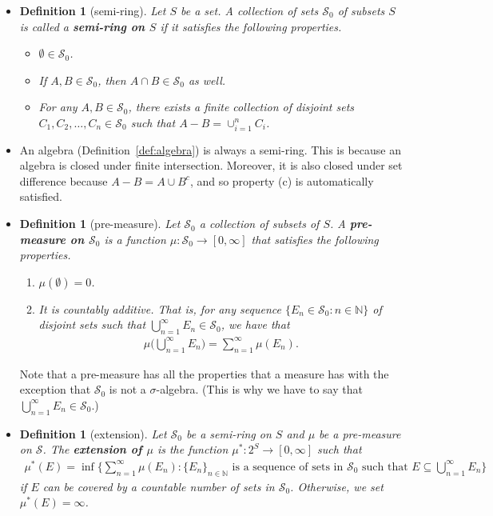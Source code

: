\documentclass[10pt]{article}
\newtheorem{definition}[lemma]{Definition}
\numberwithin{lemma}{section}
\newcommand{\mcal}[1]{\mathcal{#1}}
\newcommand{\Nat}{\mathbb{N}}
\begin{document}
\begin{itemize}
  \item \begin{definition}[semi-ring]
    Let $S$ be a set. A collection of sets $\mcal{S}_0$ of subsets $S$ is called a {\bf semi-ring on $S$} if it satisfies the following properties.
    \begin{itemize}
      \item[(a)] $\emptyset \in \mcal{S}_0$.
      \item[(b)] If $A, B \in \mcal{S}_0$, then $A \cap B \in \mcal{S}_0$ as well.
      \item[(c)] For any $A, B \in \mcal{S}_0$, there exists a finite collection of disjoint sets $C_1, C_2, \dotsc, C_n \in \mcal{S}_0$ such that $A - B = \cup_{i=1}^n C_i$.
    \end{itemize} 
  \end{definition}

  \item An algebra (Definition~\ref{def:algebra}) is always a semi-ring. This is because an algebra is closed under finite intersection. Moreover, it is also closed under set difference because $A - B = A \cup B^c$, and so property (c) is automatically satisfied.

  \item \begin{definition}[pre-measure]
    Let $\mcal{S}_0$ a collection of subsets of $S$. A {\bf pre-measure on $\mcal{S}_0$} is a function $\mu: \mcal{S}_0 \rightarrow [0,\infty]$ that satisfies the following properties.
    \begin{enumerate}
      \item $\mu(\emptyset) = 0$.
      \item It is countably additive. That is, for any sequence $\{ E_n \in \mcal{S}_0 : n \in \Nat \}$ of disjoint sets such that $\bigcup_{n=1}^\infty E_n \in \mcal{S}_0$, we have that
      \begin{align*}
        \mu\bigg( \bigcup_{n=1}^\infty E_n \bigg) = \sum_{n=1}^\infty \mu(E_n).
      \end{align*} 
    \end{enumerate}
  \end{definition}
  Note that a pre-measure has all the properties that a measure has with the exception that $\mcal{S}_0$ is not a $\sigma$-algebra. (This is why we have to say that $\bigcup_{n=1}^\infty E_n \in \mcal{S}_0$.)

  \item \begin{definition}[extension]
    Let $\mcal{S}_0$ be a semi-ring on $S$ and $\mu$ be a pre-measure on $\mcal{S}$. The {\bf extension of $\mu$} is the function $\mu^*: 2^S \rightarrow [0,\infty]$ such that
    \begin{align*}
      \mu^*(E) = \inf \bigg\{ \sum_{n=1}^\infty \mu(E_n) : \{ E_n \}_{n \in \Nat} \mbox{ is a sequence of sets in $\mcal{S}_0$ such that } E \subseteq \bigcup_{n=1}^\infty E_n \bigg\}
    \end{align*}
    if $E$ can be covered by a countable number of sets in $\mcal{S}_0$. Otherwise, we set $\mu^*(E) = \infty$.
  \end{definition}


\end{itemize}
\end{document}
